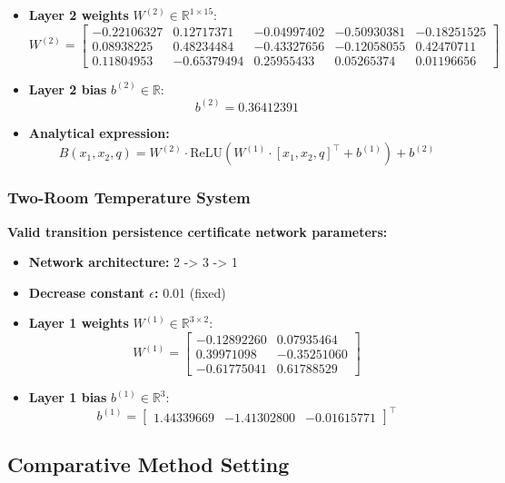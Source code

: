 \begin{itemize}
	    \item \textbf{Layer 2 weights} $W^{(2)} \in \mathbb{R}^{1 \times 15}$:
	    {\footnotesize
	    \[
	    W^{(2)} = \begin{bmatrix}
	    -0.22106327 &  0.12717371 & -0.04997402 & -0.50930381 & -0.18251525 \\
	     0.08938225 &  0.48234484 & -0.43327656 & -0.12058055 &  0.42470711 \\
	     0.11804953 & -0.65379494 &  0.25955433 &  0.05265374 &  0.01196656
	    \end{bmatrix}
	    \]}
	    
	    \item \textbf{Layer 2 bias} $b^{(2)} \in \mathbb{R}$:
	    \[
	    b^{(2)} = 0.36412391
	    \]
	    
	    \item \textbf{Analytical expression:}
	    \[
	    B(x_1, x_2, q) = W^{(2)} \cdot \text{ReLU}(W^{(1)} \cdot [x_1, x_2, q]^\top + b^{(1)}) + b^{(2)}
	    \]
	\end{itemize}

\subsubsection{Two-Room Temperature System}
\label{app:two_room_neural}
\textbf{Valid transition persistence certificate network parameters:}

\begin{itemize}
    \item \textbf{Network architecture:} 2 -> 3 -> 1
    \item \textbf{Decrease constant $\epsilon$:} 0.01 (fixed)
    \item \textbf{Layer 1 weights} $W^{(1)} \in \mathbb{R}^{3 \times 2}$:
    \[
    W^{(1)} = \begin{bmatrix}
    -0.12892260 &  0.07935464 \\
     0.39971098 & -0.35251060 \\
    -0.61775041 &  0.61788529
    \end{bmatrix}
    \]
    
    \item \textbf{Layer 1 bias} $b^{(1)} \in \mathbb{R}^{3}$:
    \[
    b^{(1)} = \begin{bmatrix}
     1.44339669 & -1.41302800 & -0.01615771
    \end{bmatrix}^\top
    \]
\end{itemize}

\subsection{Comparative Method Setting}

